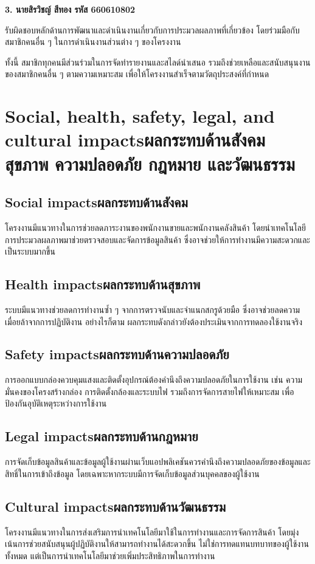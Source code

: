 \textbf{3. นายสิรวิชญ์ สีทอง รหัส 660610802}

รับผิดชอบหลักด้านการพัฒนาและดำเนินงานเกี่ยวกับการประมวลผลภาพที่เกี่ยวข้อง โดยร่วมมือกับสมาชิกคนอื่น ๆ ในการดำเนินงานส่วนต่าง ๆ ของโครงงาน

ทั้งนี้ สมาชิกทุกคนมีส่วนร่วมในการจัดทำรายงานและสไลด์นำเสนอ รวมถึงช่วยเหลือและสนับสนุนงานของสมาชิกคนอื่น ๆ ตามความเหมาะสม เพื่อให้โครงงานสำเร็จตามวัตถุประสงค์ที่กำหนด

\section{\ifenglish Social, health, safety, legal, and cultural impacts\else ผลกระทบด้านสังคม สุขภาพ ความปลอดภัย กฎหมาย และวัฒนธรรม\fi}

\subsection{\ifenglish Social impacts\else ผลกระทบด้านสังคม\fi}

โครงงานมีแนวทางในการช่วยลดภาระงานของพนักงานขายและพนักงานคลังสินค้า โดยนำเทคโนโลยีการประมวลผลภาพมาช่วยตรวจสอบและจัดการข้อมูลสินค้า ซึ่งอาจช่วยให้การทำงานมีความสะดวกและเป็นระบบมากขึ้น

\subsection{\ifenglish Health impacts\else ผลกระทบด้านสุขภาพ\fi}

ระบบมีแนวทางช่วยลดการทำงานซ้ำ ๆ จากการตรวจนับและจำแนกสกรูด้วยมือ ซึ่งอาจช่วยลดความเมื่อยล้าจากการปฏิบัติงาน อย่างไรก็ตาม ผลกระทบดังกล่าวยังต้องประเมินจากการทดลองใช้งานจริง

\subsection{\ifenglish Safety impacts\else ผลกระทบด้านความปลอดภัย\fi}

การออกแบบกล่องควบคุมแสงและติดตั้งอุปกรณ์ต้องคำนึงถึงความปลอดภัยในการใช้งาน เช่น ความมั่นคงของโครงสร้างกล่อง การติดตั้งกล้องและระบบไฟ รวมถึงการจัดการสายไฟให้เหมาะสม เพื่อป้องกันอุบัติเหตุระหว่างการใช้งาน

\subsection{\ifenglish Legal impacts\else ผลกระทบด้านกฎหมาย\fi}

การจัดเก็บข้อมูลสินค้าและข้อมูลผู้ใช้งานผ่านเว็บแอปพลิเคชันควรคำนึงถึงความปลอดภัยของข้อมูลและสิทธิ์ในการเข้าถึงข้อมูล โดยเฉพาะหากระบบมีการจัดเก็บข้อมูลส่วนบุคคลของผู้ใช้งาน

\subsection{\ifenglish Cultural impacts\else ผลกระทบด้านวัฒนธรรม\fi}

โครงงานมีแนวทางในการส่งเสริมการนำเทคโนโลยีมาใช้ในการทำงานและการจัดการสินค้า โดยมุ่งเน้นการช่วยสนับสนุนผู้ปฏิบัติงานให้สามารถทำงานได้สะดวกขึ้น ไม่ใช่การทดแทนบทบาทของผู้ใช้งานทั้งหมด แต่เป็นการนำเทคโนโลยีมาช่วยเพิ่มประสิทธิภาพในการทำงาน